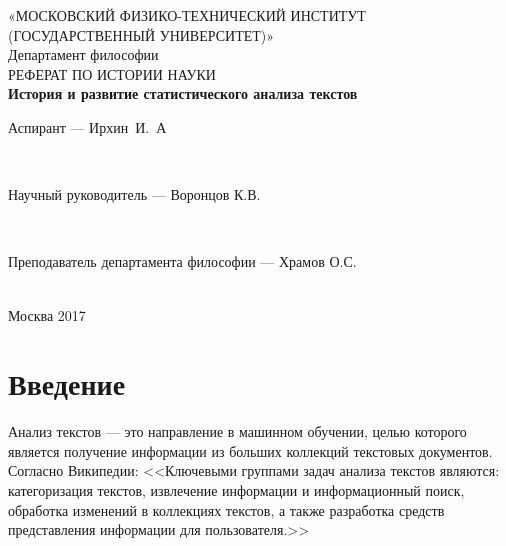 \documentclass[a4paper,14pt]{extarticle}
\renewcommand{\baselinestretch}{1.5}
\begin{document}
\begin{titlepage}

\begin{center}

«МОСКОВСКИЙ ФИЗИКО-ТЕХНИЧЕСКИЙ ИНСТИТУТ \\
(ГОСУДАРСТВЕННЫЙ УНИВЕРСИТЕТ)»\\[12em]

Департамент философии\\[1em]


{РЕФЕРАТ ПО ИСТОРИИ НАУКИ}\\[1em]
\textbf{\large История и развитие статистического анализа текстов}\\[6em]

\begin{minipage}{\textwidth}
\begin{flushright}
Аспирант --- Ирхин~И.~А
\end{flushright}
\end{minipage}\\[1em]

\begin{minipage}{\textwidth}
\begin{flushright}
Научный руководитель --- \underline{\hspace*{2.5cm}} Воронцов К.В.
\end{flushright}
\end{minipage}\\[1em]

\begin{minipage}{\textwidth}
\begin{flushright}
Преподаватель департамента философии --- Храмов О.С.
\end{flushright}
\end{minipage}\\[1em]
\vfill
{\normalsize Москва 2017}
\end{center}
\end{titlepage}

\tableofcontents
\newpage
\renewcommand{\baselinestretch}{1.5}
\section{Введение}


Анализ текстов --- это направление в машинном обучении, целью которого является получение информации из больших коллекций текстовых документов. Согласно Википедии: <<Ключевыми группами задач анализа текстов являются: категоризация текстов, извлечение информации и информационный поиск, обработка изменений в коллекциях текстов, а также разработка средств представления информации для пользователя.>>
\end{document}
